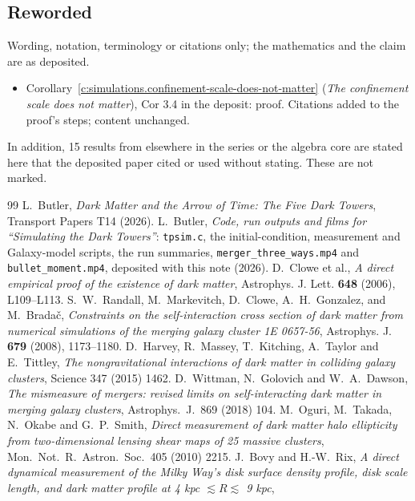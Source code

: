 \documentclass[11pt]{article}
\theoremstyle{definition}
\theoremstyle{plain}
\providecommand{\file}{}\renewcommand{\file}[1]{\texttt{#1}}
\begin{document}
\subsection*{Reworded}
Wording, notation, terminology or citations only; the mathematics and the claim are as deposited.
\begin{itemize}\setlength{\itemsep}{2pt}
\item Corollary~\ref{c:simulations.confinement-scale-does-not-matter} (\emph{The confinement scale does not matter}), Cor 3.4 in the deposit: proof. Citations added to the proof's steps; content unchanged.
\end{itemize}
\noindent In addition, 15 results from elsewhere in the series or the algebra core are stated here that the deposited paper cited or used without stating. These are not marked.
\begin{thebibliography}{99}
 L.~Butler,
\emph{Dark Matter and the Arrow of Time: The Five Dark Towers},
Transport Papers T14 (2026).
 L.~Butler,
\emph{Code, run outputs and films for ``Simulating the Dark Towers''}: \file{tpsim.c}, the initial-condition, measurement and Galaxy-model scripts, the run summaries, \file{merger\_three\_ways.mp4} and \file{bullet\_moment.mp4},
deposited with this note (2026).
 D.~Clowe et al.,
\emph{A direct empirical proof of the existence of dark matter},
Astrophys. J. Lett. \textbf{648} (2006), L109--L113.
 S.~W.~Randall, M.~Markevitch, D.~Clowe, A.~H.~Gonzalez, and M.~Brada\v{c},
\emph{Constraints on the self-interaction cross section of dark matter from numerical simulations of the merging galaxy cluster 1E 0657-56},
Astrophys. J. \textbf{679} (2008), 1173--1180.
 D.~Harvey, R.~Massey, T.~Kitching, A.~Taylor and E.~Tittley,
\emph{The nongravitational interactions of dark matter in colliding galaxy clusters},
Science 347 (2015) 1462.
 D.~Wittman, N.~Golovich and W.~A.~Dawson,
\emph{The mismeasure of mergers: revised limits on self-interacting dark matter in merging galaxy clusters},
Astrophys.\ J.\ 869 (2018) 104.
 M.~Oguri, M.~Takada, N.~Okabe and G.~P.~Smith,
\emph{Direct measurement of dark matter halo ellipticity from two-dimensional lensing shear maps of 25 massive clusters},
Mon.\ Not.\ R.\ Astron.\ Soc.\ 405 (2010) 2215.
 J.~Bovy and H.-W.~Rix,
\emph{A direct dynamical measurement of the Milky Way's disk surface density profile, disk scale length, and dark matter profile at 4 kpc $\lesssim R \lesssim$ 9 kpc},

\end{thebibliography}
\end{document}

